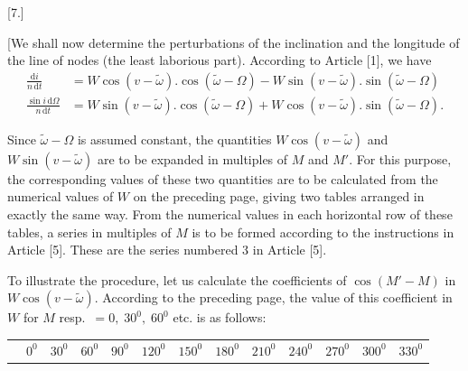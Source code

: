 \clearpage
\begin{landscape}
\begingroup
\fontsize{10}{13}\selectfont
{}
\renewcommand{\headrulewidth}{0pt}
\newcommand{\VSevenPoint}{\mathord{.}\mkern5mu}
\newcommand{\VSevenFivePoints}{\VSevenPoint\VSevenPoint\VSevenPoint\VSevenPoint\VSevenPoint}
\begin{center}[7.]\end{center}
\par\noindent\hspace*{\parindent}[We shall now determine the perturbations of the inclination and the longitude of the line of nodes (the least laborious part). According to Article [1], we have
\[
\begin{aligned}
\frac{\mathrm{d}i}{n\,\mathrm{d}t}&=W\cos(v-\tilde\omega)\mathord{.}\cos(\tilde\omega-\Omega)-W\sin(v-\tilde\omega)\mathord{.}\sin(\tilde\omega-\Omega)\\
\frac{\sin i\,\mathrm{d}\Omega}{n\,\mathrm{d}t}&=W\sin(v-\tilde\omega)\mathord{.}\cos(\tilde\omega-\Omega)+W\cos(v-\tilde\omega)\mathord{.}\sin(\tilde\omega-\Omega).
\end{aligned}
\]
\par\noindent\hspace*{\parindent}Since \(\tilde\omega-\Omega\) is assumed constant, the quantities \(W\cos(v-\tilde\omega)\) and \(W\sin(v-\tilde\omega)\) are to be expanded in multiples of \(M\) and \(M'\). For this purpose, the corresponding values of these two quantities are to be calculated from the numerical values of \(W\) on the preceding page, giving two tables arranged in exactly the same way. From the numerical values in each horizontal row of these tables, a series in multiples of \(M\) is to be formed according to the instructions in Article [5]. These are the series numbered 3 in Article [5].
\par\noindent\hspace*{\parindent}To illustrate the procedure, let us calculate the coefficients of \(\cos(M'-M)\) in \(W\cos(v-\tilde\omega)\). According to the preceding page, the value of this coefficient in \(W\) for \(M\) resp.\ \(=0,\;30^0,\;60^0\) etc. is as follows:
\begin{center}
\begingroup\fontsize{8.5}{11}\selectfont\setlength{\tabcolsep}{3pt}
\begin{tabular}{@{}l*{12}{r}@{}}
&\(0^0\)&\(30^0\)&\(60^0\)&\(90^0\)&\(120^0\)&\(150^0\)&\(180^0\)&\(210^0\)&\(240^0\)&\(270^0\)&\(300^0\)&\(330^0\)\\[4pt]

\end{tabular}
\end{center}
\end{landscape}

